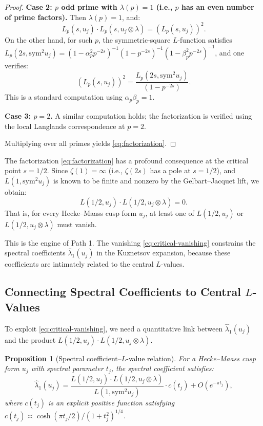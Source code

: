 \documentclass[11pt,a4paper]{article}
\theoremstyle{plain}
\newtheorem{proposition}[theorem]{Proposition}
\theoremstyle{definition}
\newcommand{\sym}{\mathrm{sym}}
\begin{document}
\begin{proof}
\textbf{Case 2: $p$ odd prime with $\lambda(p) = 1$ (i.e., $p$ has an even number of prime factors).} Then $\lambda(p) = 1$, and:
\[
L_p(s, u_j) \cdot L_p(s, u_j \otimes \lambda) = (L_p(s, u_j))^2.
\]
On the other hand, for such $p$, the symmetric-square $L$-function satisfies $L_p(2s, \sym^2 u_j) = (1 - \alpha_p^2 p^{-2s})^{-1}(1 - p^{-2s})^{-1}(1 - \beta_p^2 p^{-2s})^{-1}$, and one verifies:
\[
(L_p(s, u_j))^2 = \frac{L_p(2s, \sym^2 u_j)}{(1 - p^{-2s})}.
\]
This is a standard computation using $\alpha_p \beta_p = 1$.

\textbf{Case 3: $p = 2$.} A similar computation holds; the factorization is verified using the local Langlands correspondence at $p = 2$.

Multiplying over all primes yields \eqref{eq:factorization}.
\end{proof}

\begin{keyresult}
The factorization \eqref{eq:factorization} has a profound consequence at the critical point $s = 1/2$. Since $\zeta(1) = \infty$ (i.e., $\zeta(2s)$ has a pole at $s = 1/2$), and $L(1, \sym^2 u_j)$ is known to be finite and nonzero by the Gelbart--Jacquet lift, we obtain:
\begin{equation}
\label{eq:critical-vanishing}
L(1/2, u_j) \cdot L(1/2, u_j \otimes \lambda) = 0.
\end{equation}
That is, for every Hecke--Maass cusp form $u_j$, at least one of $L(1/2, u_j)$ or $L(1/2, u_j \otimes \lambda)$ must vanish.
\end{keyresult}

This is the engine of Path 1. The vanishing \eqref{eq:critical-vanishing} constrains the spectral coefficients $\hat{\lambda}_1(u_j)$ in the Kuznetsov expansion, because these coefficients are intimately related to the central $L$-values.

\subsection{Connecting Spectral Coefficients to Central $L$-Values}
\label{subsec:spectral-L-connection}

To exploit \eqref{eq:critical-vanishing}, we need a quantitative link between $\hat{\lambda}_1(u_j)$ and the product $L(1/2, u_j) \cdot L(1/2, u_j \otimes \lambda)$.

\begin{proposition}[Spectral coefficient--$L$-value relation]
\label{prop:spectral-L}
For a Hecke--Maass cusp form $u_j$ with spectral parameter $t_j$, the spectral coefficient satisfies:
\begin{equation}
\label{eq:spectral-L}
\hat{\lambda}_1(u_j) = \frac{L(1/2, u_j) \cdot L(1/2, u_j \otimes \lambda)}{L(1, \sym^2 u_j)} \cdot c(t_j) + O\!\left(e^{-\pi t_j}\right),
\end{equation}
where $c(t_j)$ is an explicit positive function satisfying $c(t_j) \asymp \cosh(\pi t_j / 2) / (1 + t_j^2)^{1/4}$.
\end{proposition}
\end{document}
